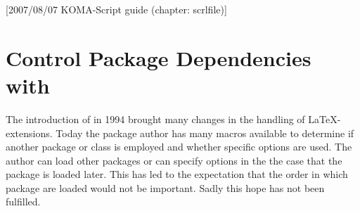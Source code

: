 %
%
%
%
%
%
%
%
% 
%
%
%
%

[2007/08/07 KOMA-Script guide (chapter: scrlfile)]

\chapter{Control Package Dependencies with }


\begin{Explain}
  The introduction of {\LaTeXe} in 1994 brought many changes in the
  handling of \LaTeX-extensions.  Today the package author has many
  macros available to determine if another package or class is
  employed and whether specific options are used.  The author can load
  other packages or can specify options in the the case that the
  package is loaded later.  This has led to the expectation that the
  order in which package are loaded would not be important.  Sadly
  this hope has not been fulfilled.
\end{Explain}

